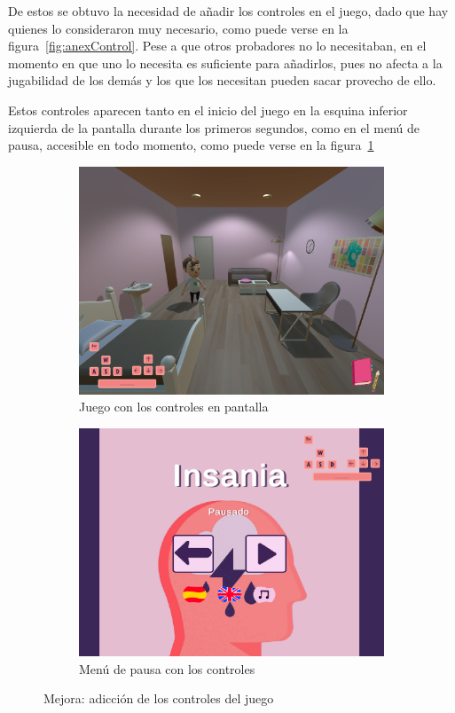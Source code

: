\documentclass[12pt, a4paper,twoside,titlepage]{book}
\begin{document}
De estos se obtuvo la necesidad de añadir los controles en el juego, dado que hay quienes lo consideraron muy necesario, como puede verse en la figura~\ref{fig:anexControl}. Pese a que otros probadores no lo necesitaban, en el momento en que uno lo necesita es suficiente para añadirlos, pues no afecta a la jugabilidad de los demás y los que los necesitan pueden sacar provecho de ello. 

Estos controles aparecen tanto en el inicio del juego en la esquina inferior izquierda de la pantalla durante los primeros segundos, como en el menú de pausa, accesible en todo momento, como puede verse en la figura~\ref{fig:UXPausaControl}



\begin{figure}
	\centering
	\begin{subfigure}{.5\textwidth}
		\centering
		\includegraphics[width=.95\linewidth]{TGF/Artes/Controles}
		\caption{Juego con los controles en pantalla}		
	\end{subfigure}%
	\begin{subfigure}{.5\textwidth}
		\centering
		\includegraphics[width=.95\linewidth]{TGF/Artes/PausaControles}
		\caption{Menú de pausa con los controles}		
	\end{subfigure}
	\caption{Mejora: adicción de los controles del juego}
	\label{fig:UXPausaControl}
\end{figure}
\end{document}
